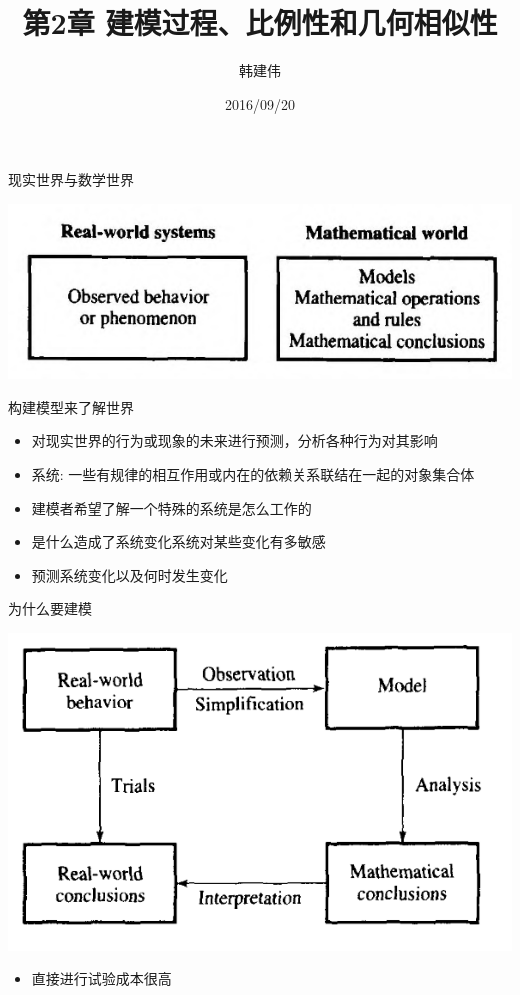 \documentclass[mathserif]{beamer}
\title{第2章 建模过程、比例性和几何相似性}
\author{韩建伟}
\institute{
  信息学院\\
  \texttt{mm@hanjianwei.com}
}
\date{2016/09/20}
\begin{document}
\begin{frame}[plain]
  \titlepage{}
\end{frame}

\begin{frame}{现实世界与数学世界}

  \begin{center}
    \includegraphics[width=.5\textwidth{}]{real_and_math.png}
  \end{center}

  构建模型来了解世界

  \begin{itemize}
  \item 对现实世界的行为或现象的未来进行预测，分析各种行为对其影响
  \item 系统: 一些有规律的相互作用或内在的依赖关系联结在一起的对象集合体
  \item 建模者希望了解一个特殊的系统是怎么工作的
  \item 是什么造成了系统变化系统对某些变化有多敏感
  \item 预测系统变化以及何时发生变化
  \end{itemize}

\end{frame}

\begin{frame}{为什么要建模}
  \begin{center}
    \includegraphics[width=.5\textwidth{}]{whymm.png}
  \end{center}

  \begin{itemize}
  \item 直接进行试验成本很高
  \end{itemize}
\end{frame}
\end{document}
